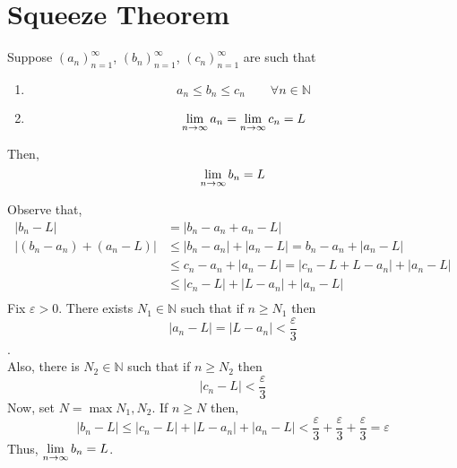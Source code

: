 \documentclass[12pt]{article}
\begin{document}
\maketitle
\newpage
\tableofcontents
\newpage
\section{Squeeze Theorem}
\begin{theo}{}
    Suppose \(\left(a_n\right)^\infty _{n=1}\), \(\left(b_n\right)^\infty _{n=1}\), \(\left(c_n\right)^\infty _{n=1}\) are such that
    \begin{enumerate}
        \item \[a_n \leq b_n \leq c_n \qquad \forall n \in \mathbb{N}\]

        \item \[\displaystyle\lim_{n\to\infty} a_n = \displaystyle\lim_{n\to\infty} c_n = L\]
    \end{enumerate}
    Then,
    \[\displaystyle\lim_{n\to\infty} b_n = L\]
\end{theo}
\begin{prf}{}
    Observe that,  
\begin{align*}
|b_n - L| &= |b_n - a_n + a_n - L|\\
|(b_n - a_n) + (a_n - L)| &\le |b_n - a_n| + |a_n - L| = b_n - a_n + |a_n - L|\\
&\le c_n - a_n + |a_n - L| = |c_n - L + L - a_n| + |a_n - L|\\
&\le |c_n - L| + |L - a_n| + |a_n - L|\\
\end{align*}
Fix $\varepsilon > 0$. There exists $N_1 \in \mathbb N$ such that if $n \ge N_1$ then $$|a_n - L| = |L - a_n| < \frac{\varepsilon}{3}$$.\\
Also, there is $N_2 \in \mathbb N$ such that if $n \ge N_2$ then $$|c_n - L| < \frac{\varepsilon}{3}$$
Now, set $N = \max{N_1, N_2}.$ If $n \ge N$ then, $$|b_n - L| \le |c_n - L| + |L - a_n| + |a_n - L| < \frac{\varepsilon}{3} + \frac{\varepsilon}{3} + \frac{\varepsilon}{3} = \varepsilon$$ Thus, $\displaystyle\lim_{n\to\infty}{b_n} = L$. \\
\end{prf}

\newpage
\end{document}

